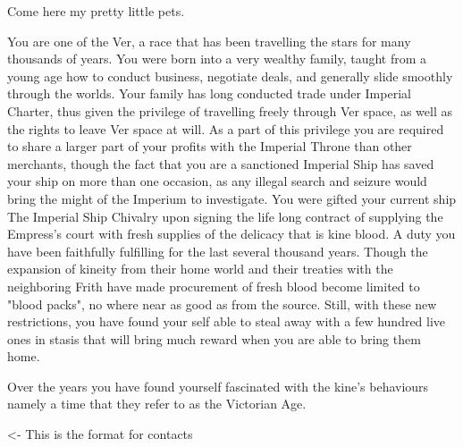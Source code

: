 \documentclass[char]{guildcamp4}
\begin{document}
\name{\cVone{}}


Come here my pretty little pets.

You are one of the Ver, a race that has been travelling the stars for many thousands of years. You were born into a very 
wealthy family, taught from a young age how to conduct business, negotiate deals, and generally slide smoothly through the
worlds. Your family has long conducted trade under Imperial Charter, thus given the privilege of travelling freely through
Ver space, as well as the rights to leave Ver space at will. As a part of this privilege you are required to share a larger 
part of your profits with the Imperial Throne than other merchants, though the fact that you are a sanctioned Imperial Ship 
has saved your ship on more than one occasion, as any illegal search and seizure would bring the might of the Imperium to 
investigate. You were gifted your current ship The Imperial Ship Chivalry upon signing the life long contract of supplying 
the Empress's court with fresh supplies of the delicacy that is kine blood. A duty you have been faithfully fulfilling for
the last several thousand years. Though the expansion of kineity from their home world and their treaties with the neighboring
Frith have made procurement of fresh blood become limited to "blood packs", no where near as good as from the source.
Still, with these new restrictions, you have found your self able to steal away with a few hundred live ones in stasis 
that will bring much reward when you are able to bring them home. 

Over the years you have found yourself fascinated with the kine's behaviours namely a time that they refer to as the 
Victorian Age. 

\begin{itemz}[Goals]
	\item 
\end{itemz}

\begin{itemz}[Notes]
	\item 
\end{itemz}

\begin{contacts}
	\contact{\cVtwo{}} <- This is the format for contacts 
	\contact{\cVthree{}}
	\contact{\cJoan{}}
	\contact{\cJulie{}}
	\contact{\cJames{}}
	\contact{\cRasputin{}}
	\contact{\cSpite{}}
	\contact{\cPlead{}}
\end{contacts}
\end{document}
